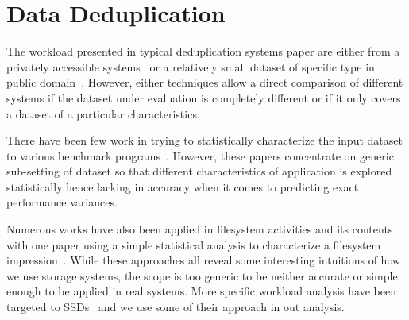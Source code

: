 \section{Data Deduplication}

The workload presented in typical deduplication systems paper are either from a privately accessible systems~\cite{clements:2009, rhea:2008, manber:1994, aronovich:2009, lillibridge:2009, zhu:2008} or a relatively small dataset of specific type in public domain~\cite{storer:2008, kruus:2010, eshghi:2005}. 
However, either techniques allow a direct comparison of different systems if the dataset under evaluation is completely different or if it only covers a dataset of a particular characteristics.

There have been few work in trying to statistically characterize the input dataset to various benchmark programs~\cite{eeckhout:2003, yi:2002, hsu:2002}. 
However, these papers concentrate on generic sub-setting of dataset so that different characteristics of application is explored statistically hence lacking in accuracy when it comes to predicting exact performance variances.

Numerous works have also been applied in filesystem activities and its contents~\cite{douceur:1999, leung:2008, douceur:1999} with one paper using a simple statistical analysis to characterize a filesystem impression~\cite{agrawal:2009}. 
While these approaches all reveal some interesting intuitions of how we use storage systems, the scope is too generic to be neither accurate or simple enough to be applied in real systems. 
More specific workload analysis have been targeted to SSDs~\cite{soundararajan:2010} and we use some of their approach in out analysis.
